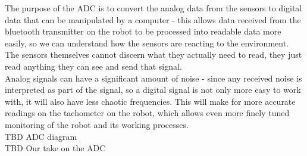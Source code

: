 The purpose of the ADC is to convert the analog data from the sensors to digital data that can be manipulated by a computer - this allows data received from the bluetooth transmitter on the robot to be processed into readable data more easily, so we can understand how the sensors are reacting to the environment. The sensors themselves cannot discern what they actually need to read, they just read anything they can see and send that signal. \\
Analog signals can have a significant amount of noise - since any received noise is interpreted as part of the signal, so a digital signal is not only more easy to work with, it will also have less chaotic frequencies. This will make for more accurate readings on the tachometer on the robot, which allows even more finely tuned monitoring of the robot and its working processes. \\

TBD ADC diagram\\

TBD Our take on the ADC

